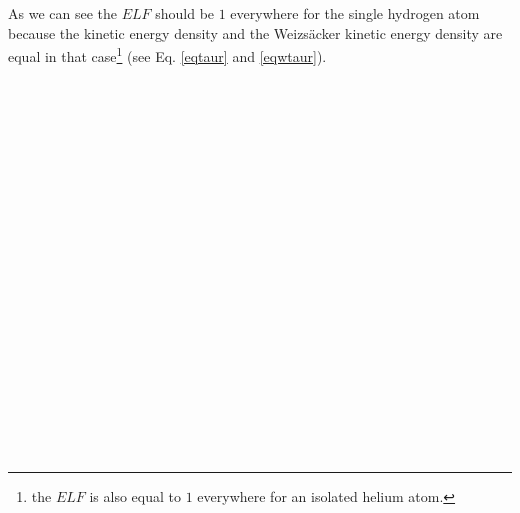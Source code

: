 \documentclass[a4paper,12pt]{report}
\begin{document}
As we can see the $ELF$ should be $1$ everywhere for the single hydrogen atom because the kinetic energy density and the Weizs\"{a}cker kinetic energy density are equal in that case\footnote{the $ELF$ is also equal to $1$ everywhere for an isolated helium atom.} (see Eq. \ref{eqtaur} and \ref{eqwtaur}).\\\\\\\\\\\\\\\\\\\\\\\\\\\\\\\\\\\\\\\\\
\end{document}
